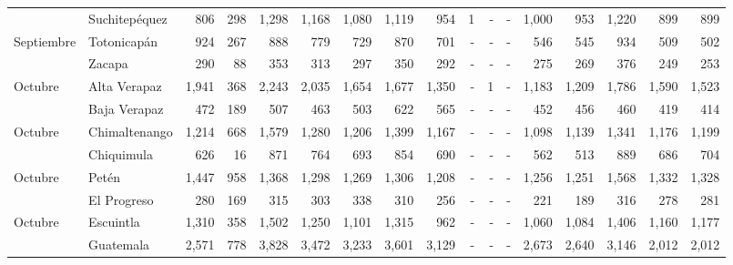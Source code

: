 \begin{landscape}
\begin{center}
\begin{longtable}{llrrrrrrrrrrrrrrr}
			\rowcolor{color1!5!white}\multicolumn{1}{l}{	\footnotesize	 Septiembre 	}&	 Suchitepéquez 	&	 806 	&	 298 	&	 1,298 	&	 1,168 	&	 1,080 	&	 1,119 	&	 954 	&	 1 	&	 -   	&	 -   	&	 1,000 	&	 953 	&	 1,220 	&	 899 	&	 899 	\\
			\multicolumn{1}{l}{	\footnotesize	 Septiembre 	}&	 Totonicapán 	&	 924 	&	 267 	&	 888 	&	 779 	&	 729 	&	 870 	&	 701 	&	 -   	&	 -   	&	 -   	&	 546 	&	 545 	&	 934 	&	 509 	&	 502 	\\
			\rowcolor{color1!5!white}\multicolumn{1}{l}{	\footnotesize	 Septiembre 	}&	 Zacapa 	&	 290 	&	 88 	&	 353 	&	 313 	&	 297 	&	 350 	&	 292 	&	 -   	&	 -   	&	 -   	&	 275 	&	 269 	&	 376 	&	 249 	&	 253 	\\
			\multicolumn{1}{l}{	\footnotesize	 Octubre 	}&	 Alta Verapaz 	&	 1,941 	&	 368 	&	 2,243 	&	 2,035 	&	 1,654 	&	 1,677 	&	 1,350 	&	 -   	&	 1 	&	 -   	&	 1,183 	&	 1,209 	&	 1,786 	&	 1,590 	&	 1,523 	\\
			\rowcolor{color1!5!white}\multicolumn{1}{l}{	\footnotesize	 Octubre 	}&	 Baja Verapaz 	&	 472 	&	 189 	&	 507 	&	 463 	&	 503 	&	 622 	&	 565 	&	 -   	&	 -   	&	 -   	&	 452 	&	 456 	&	 460 	&	 419 	&	 414 	\\
			\multicolumn{1}{l}{	\footnotesize	 Octubre 	}&	 Chimaltenango 	&	 1,214 	&	 668 	&	 1,579 	&	 1,280 	&	 1,206 	&	 1,399 	&	 1,167 	&	 -   	&	 -   	&	 -   	&	 1,098 	&	 1,139 	&	 1,341 	&	 1,176 	&	 1,199 	\\
			\rowcolor{color1!5!white}\multicolumn{1}{l}{	\footnotesize	 Octubre 	}&	 Chiquimula 	&	 626 	&	 16 	&	 871 	&	 764 	&	 693 	&	 854 	&	 690 	&	 -   	&	 -   	&	 -   	&	 562 	&	 513 	&	 889 	&	 686 	&	 704 	\\
			\multicolumn{1}{l}{	\footnotesize	 Octubre 	}&	 Petén 	&	 1,447 	&	 958 	&	 1,368 	&	 1,298 	&	 1,269 	&	 1,306 	&	 1,208 	&	 -   	&	 -   	&	 -   	&	 1,256 	&	 1,251 	&	 1,568 	&	 1,332 	&	 1,328 	\\
			\rowcolor{color1!5!white}\multicolumn{1}{l}{	\footnotesize	 Octubre 	}&	 El Progreso 	&	 280 	&	 169 	&	 315 	&	 303 	&	 338 	&	 310 	&	 256 	&	 -   	&	 -   	&	 -   	&	 221 	&	 189 	&	 316 	&	 278 	&	 281 	\\
			\multicolumn{1}{l}{	\footnotesize	 Octubre 	}&	 Escuintla 	&	 1,310 	&	 358 	&	 1,502 	&	 1,250 	&	 1,101 	&	 1,315 	&	 962 	&	 -   	&	 -   	&	 -   	&	 1,060 	&	 1,084 	&	 1,406 	&	 1,160 	&	 1,177 	\\
			\rowcolor{color1!5!white}\multicolumn{1}{l}{	\footnotesize	 Octubre 	}&	 Guatemala 	&	 2,571 	&	 778 	&	 3,828 	&	 3,472 	&	 3,233 	&	 3,601 	&	 3,129 	&	 -   	&	 -   	&	 -   	&	 2,673 	&	 2,640 	&	 3,146 	&	 2,012 	&	 2,012 	\\

\end{longtable}
\end{center}
\end{landscape}
